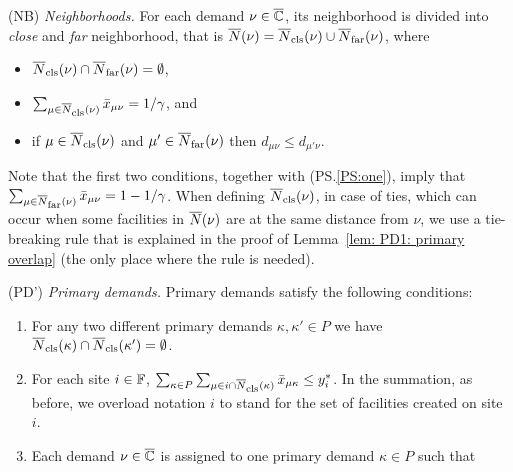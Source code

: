 \documentclass[oneside,final]{ucr}
\begin{document}
\begin{description}
	
      \renewcommand{\theenumii}{(\alph{enumii})}
      \renewcommand{\labelenumii}{\theenumii}

\item{(NB)} \label{NB}
	\emph{Neighborhoods.}
	For each demand $\nu \in \overline{\mathbb{C}}$, its neighborhood is divided into \emph{close} and
	\emph{far} neighborhood, that is ${\overline{N}}(\nu) = {\overline{N}}_{{\mbox{\scriptsize\rm cls}}}(\nu) \cup {\overline{N}}_{{\mbox{\scriptsize\rm far}}}(\nu)$, where
	\begin{itemize}
	\item ${\overline{N}}_{{\mbox{\scriptsize\rm cls}}}(\nu) \cap {\overline{N}}_{{\mbox{\scriptsize\rm far}}}(\nu) = \emptyset$,
	\item $\sum_{\mu\in{\overline{N}}_{{\mbox{\scriptsize\rm cls}}}(\nu)} {\bar x}_{\mu\nu} =1/\gamma$, and 
	\item if $\mu\in {\overline{N}}_{{\mbox{\scriptsize\rm cls}}}(\nu)$ and $\mu'\in {\overline{N}}_{{\mbox{\scriptsize\rm far}}}(\nu)$ 
				then $d_{\mu\nu}\le d_{\mu'\nu}$.   
	\end{itemize}
	Note that the first two conditions, together with
        (PS.\ref{PS:one}), imply that $\sum_{\mu\in{\overline{N}}_{{\mbox{\scriptsize\rm far}}}(\nu)}
        {\bar x}_{\mu\nu} =1-1/\gamma$. When defining ${\overline{N}}_{{\mbox{\scriptsize\rm cls}}}(\nu)$,
        in case of ties, which can occur when some facilities in
        ${\overline{N}}(\nu)$ are at the same distance from $\nu$, we use a
        tie-breaking rule that is explained in the proof of
        Lemma~\ref{lem: PD1: primary overlap} (the only place where
        the rule is needed).

\item{(PD')} \emph{Primary demands.}
	Primary demands satisfy the following conditions:

	\begin{enumerate}
		
	\item\label{PD1:disjoint}  For any two different primary demands $\kappa,\kappa'\in P$ we have
				${\overline{N}}_{{\mbox{\scriptsize\rm cls}}}(\kappa)\cap {\overline{N}}_{{\mbox{\scriptsize\rm cls}}}(\kappa') = \emptyset$.

	\item \label{PD1:yi} For each site $i\in\mathbb{F}$, 
		$ \sum_{\kappa\in P}\sum_{\mu\in
                  i\cap{\overline{N}}_{{\mbox{\scriptsize\rm cls}}}(\kappa)}{\bar x}_{\mu\kappa} \leq
                y_i^\ast$. In the summation, as before, we overload notation $i$ to stand for the set of
						facilities created on site $i$.
		
	\item \label{PD1:assign} Each demand $\nu\in\overline{\mathbb{C}}$ is assigned
        to one primary demand $\kappa\in P$ such that

  			\begin{enumerate}
	

\end{enumerate}
\end{enumerate}
\end{description}
\end{document}
